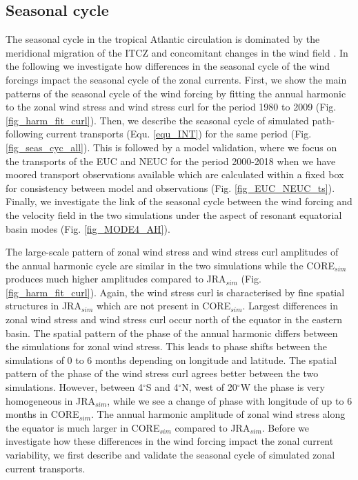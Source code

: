 \documentclass[os, manuscript]{copernicus}
\begin{document}
	\subsection{Seasonal cycle}
	The seasonal cycle in the tropical Atlantic circulation is dominated by the meridional migration of the ITCZ and concomitant changes in the wind field \citep[e.g.,][]{Xie2004}. In the following we investigate how differences in the seasonal cycle of the wind forcings impact the seasonal cycle of the zonal currents. First, we show the main patterns of the seasonal cycle of the wind forcing by fitting the annual harmonic to the zonal wind stress and wind stress curl for the period 1980 to 2009 (Fig. \ref{fig_harm_fit_curl}). Then, we describe the seasonal cycle of simulated path-following current transports (Equ. \ref{equ_INT}) for the same period (Fig. \ref{fig_seas_cyc_all}). This is followed by a model validation, where we focus on the transports of the EUC and NEUC for the period 2000-2018 when we have moored transport observations available which are calculated within a fixed box for consistency between model and observations (Fig. \ref{fig_EUC_NEUC_ts}). Finally, we investigate the link of the seasonal cycle between the wind forcing and the velocity field in the two simulations under the aspect of resonant equatorial basin modes (Fig. \ref{fig_MODE4_AH}).
	
	The large-scale pattern of zonal wind stress and wind stress curl amplitudes of the annual harmonic cycle are similar in the two simulations while the CORE$_{sim}$ produces much higher amplitudes compared to JRA$_{sim}$ (Fig. \ref{fig_harm_fit_curl}). Again, the wind stress curl is characterised by fine spatial structures in JRA$_{sim}$ which are not present in CORE$_{sim}$. Largest differences in zonal wind stress and wind stress curl occur north of the equator in the eastern basin. The spatial pattern of the phase of the annual harmonic differs between the simulations  for zonal wind stress. This leads to phase shifts between the simulations of 0 to 6 months depending on longitude and latitude. The spatial pattern of the phase of the wind stress curl agrees better between the two simulations. However, between 4$^{\circ}$S and 4$^{\circ}$N, west of 20$^{\circ}$W the phase is very homogeneous in JRA$_{sim}$, while we see a change of phase with longitude of up to 6 months in CORE$_{sim}$. The annual harmonic amplitude of zonal wind stress along the equator is much larger in CORE$_{sim}$ compared to JRA$_{sim}$. Before we investigate how these differences in the wind forcing impact the zonal current variability, we  first describe and validate the seasonal cycle of simulated zonal current transports.
	
\end{document}
